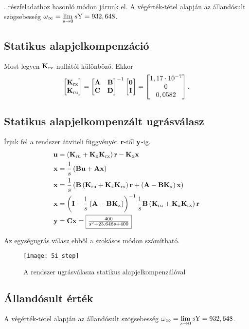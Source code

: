 . részfeladathoz hasonló módon járunk el.
A végérték-tétel alapján az állandósult szögsebesség $\omega_\infty = \lim\limits_{s\rightarrow 0}s\fn{Y} = 932,648$.%


\subsection{Statikus alapjelkompenzáció}

Most legyen $\B{K}_\text{rx}$ nullától különböző.
Ekkor
\begin{equation}
	\mat{\B{K}_\text{rx}\\\B{K}_\text{ru}}=\mat{\B{A}&\B{B}\\\B{C}&\B{D}}^{-1}\mat{\B{0}\\\B{I}}
	= \mat{1,17\cdot10^{-7}\\0\\0,0582}.
\end{equation}


\subsection{Statikus alapjelkompenzált ugrásválasz}

Írjuk fel a rendszer átviteli függvényét $\B{r}$-től $\B{y}$-ig.
\begin{align}
	\B{u} &= \brc{\B{K}_\text{ru}+\B{K}_\text{x}\B{K}_\text{rx}}\B{r} - \B{K}_\text{x}\B{x}\\
	\B{x} &= \frac{1}{s}\brc{\B{B}\B{u} + \B{A}\B{x}}\\
	\B{x} &= \frac{1}{s}\brc{\B{B}\brc{\B{K}_\text{ru}+\B{K}_\text{x}\B{K}_\text{rx}}\B{r}+\brc{\B{A}-\B{B}\B{K}_\text{x}}\B{x}}\\
	\B{x} &= \brc{\B{I}-\frac{1}{s}\brc{\B{A}-\B{B}\B{K}_\text{x} }}^{-1}\frac{1}{s}\B{B}\brc{\B{K}_\text{ru}+\B{K}_\text{x}\B{K}_\text{rx}}\B{r}\\
	\B{y} &= \B{C}\B{x} = \fbox{$\frac{400}{s^2 + 23,646 s + 400}$}
\end{align}

Az egységugrás válasz ebből a szokásos módon számítható.
\begin{figure}[H]
	\centering
	\texttt{[image: 5i\_step]}
	\caption{A rendszer ugrásválasza statikus alapjelkompenzálóval}
	\label{fig:5i_step}
\end{figure}


\subsection{Állandósult érték}

A végérték-tétel alapján az állandósult szögsebesség $\omega_\infty = \lim\limits_{s\rightarrow 0}s\fn{Y} = 932,648$.


